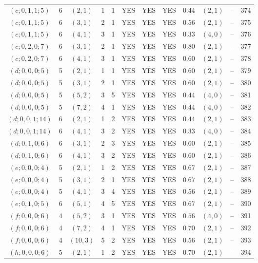 \begin{longtable}{|c|c|c|c|c|c|c|c|c|c|c|c|}
$(c;0,1,1;5)$ & 6 & $(2,1)$ & 1 & 1 & YES & YES & YES & $0.44$ & $(2,1)$ & -- & 374\\
$(c;0,1,1;5)$ & 6 & $(3,1)$ & 2 & 1 & YES & YES & YES & $0.56$ & $(2,1)$ & -- & 375\\
$(c;0,1,1;5)$ & 6 & $(4,1)$ & 3 & 1 & YES & YES & YES & $0.33$ & $(4,0)$ & -- & 376\\
$(c;0,2,0;7)$ & 6 & $(3,1)$ & 2 & 1 & YES & YES & YES & $0.80$ & $(2,1)$ & -- & 377\\
$(c;0,2,0;7)$ & 6 & $(4,1)$ & 3 & 1 & YES & YES & YES & $0.60$ & $(2,1)$ & -- & 378\\
$(d;0,0,0;5)$ & 5 & $(2,1)$ & 1 & 1 & YES & YES & YES & $0.60$ & $(2,1)$ & -- & 379\\
$(d;0,0,0;5)$ & 5 & $(3,1)$ & 2 & 1 & YES & YES & YES & $0.60$ & $(2,1)$ & -- & 380\\
$(d;0,0,0;5)$ & 5 & $(5,2)$ & 3 & 5 & YES & YES & YES & $0.44$ & $(4,0)$ & -- & 381\\
$(d;0,0,0;5)$ & 5 & $(7,2)$ & 4 & 1 & YES & YES & YES & $0.44$ & $(4,0)$ & -- & 382\\
$(d;0,0,1;14)$ & 6 & $(2,1)$ & 1 & 2 & YES & YES & YES & $0.44$ & $(2,1)$ & -- & 383\\
$(d;0,0,1;14)$ & 6 & $(4,1)$ & 3 & 2 & YES & YES & YES & $0.33$ & $(4,0)$ & -- & 384\\
$(d;0,1,0;6)$ & 6 & $(3,1)$ & 2 & 3 & YES & YES & YES & $0.60$ & $(2,1)$ & -- & 385\\
$(d;0,1,0;6)$ & 6 & $(4,1)$ & 3 & 2 & YES & YES & YES & $0.60$ & $(2,1)$ & -- & 386\\
$(e;0,0,0;4)$ & 5 & $(2,1)$ & 1 & 2 & YES & YES & YES & $0.67$ & $(2,1)$ & -- & 387\\
$(e;0,0,0;4)$ & 5 & $(3,1)$ & 2 & 1 & YES & YES & YES & $0.67$ & $(2,1)$ & -- & 388\\
$(e;0,0,0;4)$ & 5 & $(4,1)$ & 3 & 4 & YES & YES & YES & $0.56$ & $(2,1)$ & -- & 389\\
$(e;0,1,0;5)$ & 6 & $(5,1)$ & 4 & 5 & YES & YES & YES & $0.67$ & $(2,1)$ & -- & 390\\
$(f;0,0,0;6)$ & 4 & $(5,2)$ & 3 & 1 & YES & YES & YES & $0.56$ & $(4,0)$ & -- & 391\\
$(f;0,0,0;6)$ & 4 & $(7,2)$ & 4 & 1 & YES & YES & YES & $0.70$ & $(2,1)$ & -- & 392\\
$(f;0,0,0;6)$ & 4 & $(10,3)$ & 5 & 2 & YES & YES & YES & $0.56$ & $(2,1)$ & -- & 393\\
$(h;0,0,0;6)$ & 5 & $(2,1)$ & 1 & 2 & YES & YES & YES & $0.70$ & $(2,1)$ & -- & 394\\

\end{longtable}
